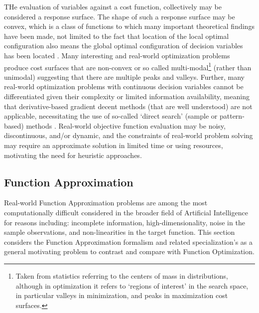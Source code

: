 \begin{bibunit}
THe evaluation of variables against a cost function, collectively may be considered a response surface. The shape of such a response surface may be convex, which is a class of functions to which many important theoretical findings have been made, not limited to the fact that location of the local optimal configuration also means the global optimal configuration of decision variables has been located \cite{Boyd2004}. Many interesting and real-world optimization problems produce cost surfaces that are non-convex or so called multi-modal\footnote{Taken from statistics referring to the centers of mass in distributions, although in optimization it refers to `regions of interest' in the search space, in particular valleys in minimization, and peaks in maximization cost surfaces.} (rather than unimodal) suggesting that there are multiple peaks and valleys. Further, many real-world optimization problems with continuous decision variables cannot be differentiated given their complexity or limited information availability, meaning that derivative-based gradient decent methods (that are well understood) are not applicable, necessitating the use of so-called `direct search' (sample or pattern-based) methods \cite{Lewis2000}. Real-world objective function evaluation may be noisy, discontinuous, and/or dynamic, and the constraints of real-world problem solving may require an approximate solution in limited time or using resources, motivating the need for heuristic approaches.


% 
%
\subsection{Function Approximation}
\label{subsec:function_approximation}
Real-world Function Approximation problems are among the most computationally difficult considered in the broader field of Artificial Intelligence for reasons including: incomplete information, high-dimensionality, noise in the sample observations, and non-linearities in the target function.
This section considers the Function Approximation formalism and related specialization's as a general motivating problem to contrast and compare with Function Optimization.

%
%

\end{bibunit}
